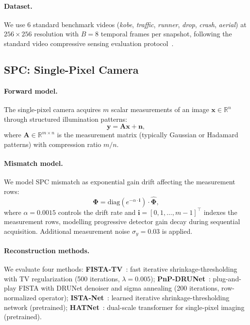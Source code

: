 \documentclass[runningheads]{llncs}
\begin{document}
\paragraph{Dataset.}
We use 6 standard benchmark videos (\textit{kobe}, \textit{traffic}, \textit{runner}, \textit{drop}, \textit{crash}, \textit{aerial}) at $256 \times 256$ resolution with $B = 8$ temporal frames per snapshot, following the standard video compressive sensing evaluation protocol~\cite{yuan2021snapshot}.

\subsection{SPC: Single-Pixel Camera}
\label{sec:spc}

\paragraph{Forward model.}
The single-pixel camera acquires $m$ scalar measurements of an image $\mathbf{x} \in \mathbb{R}^{n}$ through structured illumination patterns:
\begin{equation}
    \mathbf{y} = \mathbf{A}\mathbf{x} + \mathbf{n},
    \label{eq:spc_forward}
\end{equation}
where $\mathbf{A} \in \mathbb{R}^{m \times n}$ is the measurement matrix (typically Gaussian or Hadamard patterns) with compression ratio $m/n$.

\paragraph{Mismatch model.}
We model SPC mismatch as exponential gain drift affecting the measurement rows:
\begin{equation}
    \mathbf{\Phi} = \text{diag}\!\left(e^{-\alpha \cdot \mathbf{i}}\right) \cdot \hat{\mathbf{\Phi}},
\end{equation}
where $\alpha = 0.0015$ controls the drift rate and $\mathbf{i} = [0, 1, \ldots, m{-}1]^{\!\top}$ indexes the measurement rows, modelling progressive detector gain decay during sequential acquisition.
Additional measurement noise $\sigma_y = 0.03$ is applied.

\paragraph{Reconstruction methods.}
We evaluate four methods:
\textbf{FISTA-TV}~\cite{beck2009fista}: fast iterative shrinkage-thresholding with TV regularization (500 iterations, $\lambda = 0.005$);
\textbf{PnP-DRUNet}~\cite{zhang2021drunet}: plug-and-play FISTA with DRUNet denoiser and sigma annealing (200 iterations, row-normalized operator);
\textbf{ISTA-Net}~\cite{zhang2018istanet}: learned iterative shrinkage-thresholding network (pretrained);
\textbf{HATNet}~\cite{qu2024hatnet}: dual-scale transformer for single-pixel imaging (pretrained).
\end{document}
